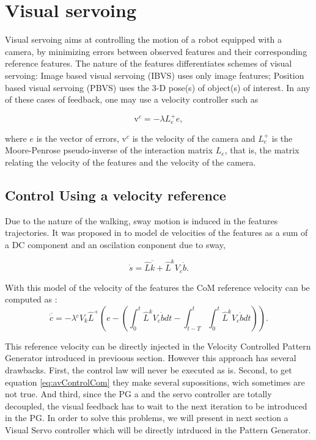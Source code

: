 \chapter{Visual servoing} 
\label{Chap:Visual-Servoing}

Visual servoing aims at controlling the motion of a robot equipped with a camera, by minimizing errors between observed features and their corresponding reference features. The nature of the features differentiates schemes of visual servoing: Image based visual servoing (IBVS) uses only image features; Position based visual servoing (PBVS) uses the 3-D pose(s) of object(s) of interest. In any of these cases of feedback, one may use a velocity controller such as

$$
\text{v}^c = -\lambda L_e^{+}e,
$$

where $e$ is the vector of errors, $\text{v}^c$ is the velocity of the camera and $L_e^{+}$ is the Moore-Penrose pseudo-inverse of the interaction matrix $L_e$, that is, the matrix relating the velocity of the features and the velocity of the camera.

\section{Control Using a velocity reference}
\label{Sec:ClassicalVS}

Due to the nature of the walking, sway motion is induced in the features trajectories. It was proposed in \citep{DuneIROS2010} to model de velocities of the features as a sum of a DC component and an oscilation conponent due to sway,

\begin{equation}
\dot{s}={\widehat{L}}\overline{\dot{k}}+{\widehat{L}} ^{k}V_{c}{\dot{b}}.
\end{equation}

With this model of the velocity of the features the CoM reference velocity can be computed as :
\begin{equation} 
\overline{\dot{c}}= -\lambda{ ^{c}V_{k}{\widehat{L}}^{+}}(e -  (\int_{0}^{t}{\widehat{L}} ^{k}V_{c}\dot{b}dt -\int_{t-T}^t\int_0^t{\widehat{L}} ^{k}V_{c}\dot{b}dt)).
\label{eq:avControlCom} 
\end{equation} 

This reference velocity can be directly injected in the Velocity Controlled Pattern Generator introduced in previoous section. However this approach has several drawbacks. First, the control law will never be executed as is. Second, to get equation \ref{eq:avControlCom} they make several supossitions, wich sometimes are not true. And third, since the PG a and the servo controller are totally decoupled, the visual feedback has to wait to the next iteration to be introduced in the PG. In order to solve this problems, we will present in next section a Visual Servo controller which will be directly intrduced in the Pattern Generator.

